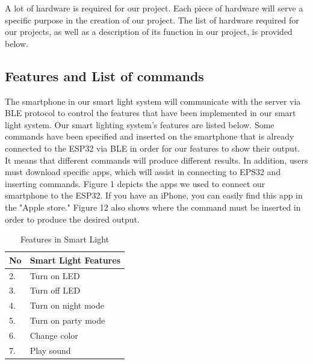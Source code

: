 A lot of hardware is required for our project. Each piece of hardware will serve a specific purpose in the creation of our project. The list of hardware required for our projects, as well as a description of its function in our project, is provided below.


\subsection{Features and List of commands}
The smartphone in our smart light system will communicate with the server via BLE protocol to control the features that have been implemented in our smart light system. Our smart lighting system's features are listed below. Some commands have been specified and inserted on the smartphone that is already connected to the ESP32 via BLE in order for our features to show their output. It means that different commands will produce different results. In addition, users must download specific apps, which will assist in connecting to EPS32 and inserting commands. Figure 1 depicts the apps we used to connect our smartphone to the ESP32. If you have an iPhone, you can easily find this app in the "Apple store." Figure 12 also shows where the command must be inserted in order to produce the desired output.

\begin{table}[]
\begin{center}
\caption{Features in Smart Light}
\begin{tabular}{|l|l|}
\hline
No & Smart   Light Features \\ \hline
2. & Turn on LED            \\ \hline
3. & Turn off LED           \\ \hline
4. & Turn on night mode     \\ \hline
5. & Turn on party mode     \\ \hline
6. & Change color           \\ \hline
7. & Play sound             \\ \hline
\end{tabular}
\end{center}
\end{table}



